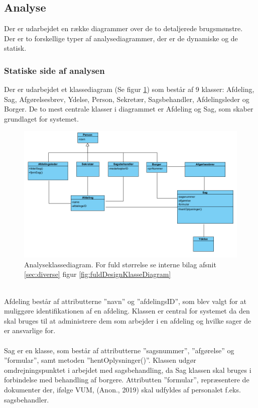 \subsection{Analyse}
Der er udarbejdet en række diagrammer over de to detaljerede brugsmønstre.\\
Der er to forskellige typer af analysediagrammer, der er de dynamiske og de statisk.

\subsubsection{Statiske side af analysen}
Der er udarbejdet et klassediagram (Se figur \ref{fig:AKlasse}) som består af 9 klasser: Afdeling, Sag, Afgørelsesbrev, Ydelse, Person, Sekretær, Sagsbehandler, Afdelingsleder og Borger. De to mest centrale klasser i diagrammet er Afdeling og Sag, som skaber grundlaget for systemet. \\ 
\begin{figure}[h]
  \includegraphics[width=\linewidth]{./PNG/analyse/analyseKlasseDiagram.PNG} 
  \caption{Analyseklassediagram. For fuld størrelse se interne bilag afsnit \ref{sec:diverse} figur \ref{fig:fuldDesignKlasseDiagram}}
  \label{fig:AKlasse}
\end{figure}
\\Afdeling består af attributterne ”navn” og ”afdelingsID”, som blev valgt for at muliggøre identifikationen af en afdeling. Klassen er central for systemet da den skal bruges til at administrere dem som arbejder i en afdeling og hvilke sager de er ansvarlige for. \\ 
\\
Sag er en klasse, som består af attributterne ”sagsnummer”, ”afgørelse” og ”formular”, samt metoden ”hentOplysninger()”. Klassen udgør omdrejningspunktet i arbejdet med sagsbehandling, da Sag klassen skal bruges i forbindelse med behandling af borgere. Attributten ”formular”, repræsentere de dokumenter der, ifølge VUM, (Anon., 2019) skal udfyldes af personalet f.eks. sagsbehandler. \\ 
